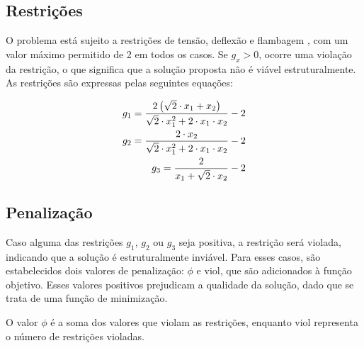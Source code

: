 
\subsection{Restrições}

O problema está sujeito a restrições de tensão, deflexão e flambagem
, com um valor máximo permitido de 2 em todos os casos. Se \(g_x > 0\), ocorre uma violação da restrição, o que significa que a solução proposta não é viável estruturalmente.
As restrições são expressas pelas seguintes equações:

\begin{gather}
      \begin{subequations}
        \begin{align}
          \begin{split}
            g_1 = \frac{2 \left( \sqrt{2} \cdot x_1 + x_2 \right)}{\sqrt{2} \cdot x_1^2 + 2 \cdot x_1 \cdot x_2} - 2
          \end{split}
          \\
          \begin{split}
            g_2 = \frac{2 \cdot x_2}{\sqrt{2} \cdot x_1^2 + 2 \cdot x_1 \cdot x_2} - 2
          \end{split}
          \\
          \begin{split}
            g_3 = \frac{2}{x_1 + \sqrt{2} \cdot x_2} - 2
          \end{split}
        \end{align}
      \end{subequations}
\end{gather}

\subsection{Penalização}

Caso alguma das restrições \(g_1\), \(g_2\) ou \(g_3\) seja positiva, a restrição será violada, indicando que a solução é estruturalmente inviável. Para esses casos, são estabelecidos dois valores de penalização: \(\phi\) e \(\text{viol}\), que são adicionados à função objetivo. Esses valores positivos prejudicam a qualidade da solução, dado que se trata de uma função de minimização. 

O valor \(\phi\) é a soma dos valores que violam as restrições, enquanto \(\text{viol}\) representa o número de restrições violadas.

